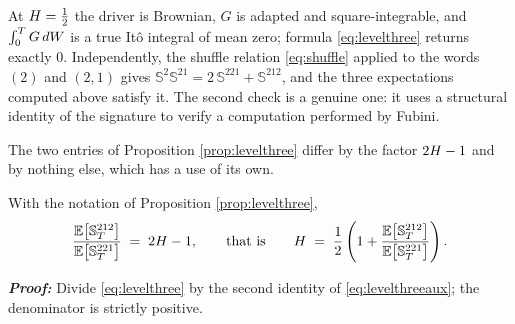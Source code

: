 \medskip

\begin{remark}\label{rem:levelthreechecks}
At $H=\tfrac12$ the driver is Brownian, $G$ is adapted and square-integrable, and
$\int_0^T G\,dW$ is a true Itô integral of mean zero; formula \eqref{eq:levelthree} returns
exactly $0$. Independently, the shuffle relation \eqref{eq:shuffle} applied to the words $(2)$ and
$(2,1)$ gives $\mathbb{S}^{2}\mathbb{S}^{21}=2\,\mathbb{S}^{221}+\mathbb{S}^{212}$, and the three
expectations computed above
satisfy it. The second check is a genuine one: it uses a structural identity of the
signature to verify a computation performed by Fubini.
\end{remark}

The two entries of Proposition \ref{prop:levelthree} differ by the factor $2H-1$ and by nothing
else, which has a use of its own.

\begin{corollary}\label{cor:Hestimator}
With the notation of Proposition \ref{prop:levelthree},
\begin{equation}\label{eq:Hratio}
  \frac{\mathbb{E}\bigl[\mathbb{S}^{212}_T\bigr]}{\mathbb{E}\bigl[\mathbb{S}^{221}_T\bigr]}\;=\;2H-1,
  \qquad\text{that is}\qquad
  H\;=\;\frac12\left(1+\frac{\mathbb{E}\bigl[\mathbb{S}^{212}_T\bigr]}{\mathbb{E}\bigl[\mathbb{S}^{221}_T\bigr]}\right).
\end{equation}
\end{corollary}

\textbf{\textit{Proof:}} Divide \eqref{eq:levelthree} by the second identity of
\eqref{eq:levelthreeaux}; the denominator is strictly positive. \qedfilledtext

\medskip


